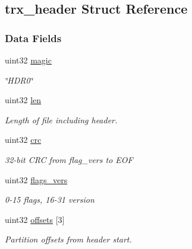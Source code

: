 \hypertarget{structtrx__header}{}\subsection{trx\+\_\+header Struct Reference}
\label{structtrx__header}
\subsubsection*{Data Fields}
\begin{DoxyCompactItemize}
\item 
\mbox{\label{structtrx__header_a3ac8f1769a120c385a69ccc7f6f1dc96}} 
uint32 \hyperlink{structtrx__header_a3ac8f1769a120c385a69ccc7f6f1dc96}{magic}
\begin{DoxyCompactList}\small\item\em \char`\"{}\+H\+D\+R0\char`\"{} \end{DoxyCompactList}\item 
\mbox{\label{structtrx__header_a9bfc119899d99937d769c4209edef740}} 
uint32 \hyperlink{structtrx__header_a9bfc119899d99937d769c4209edef740}{len}
\begin{DoxyCompactList}\small\item\em Length of file including header. \end{DoxyCompactList}\item 
\mbox{\label{structtrx__header_ad59f11ce336838baaee7a220ad2cce11}} 
uint32 \hyperlink{structtrx__header_ad59f11ce336838baaee7a220ad2cce11}{crc}
\begin{DoxyCompactList}\small\item\em 32-\/bit C\+RC from flag\+\_\+vers to E\+OF \end{DoxyCompactList}\item 
\mbox{\label{structtrx__header_aebc1fb7c68da7fff8bef888130cd1dfd}} 
uint32 \hyperlink{structtrx__header_aebc1fb7c68da7fff8bef888130cd1dfd}{flags\+\_\+vers}
\begin{DoxyCompactList}\small\item\em 0-\/15 flags, 16-\/31 version \end{DoxyCompactList}\item 
\mbox{\label{structtrx__header_a3184bf0a17c28dc6c8279dcd98c869bd}} 
uint32 \hyperlink{structtrx__header_a3184bf0a17c28dc6c8279dcd98c869bd}{offsets} \mbox{[}3\mbox{]}
\begin{DoxyCompactList}\small\item\em Partition offsets from header start. \end{DoxyCompactList}\end{DoxyCompactItemize}


